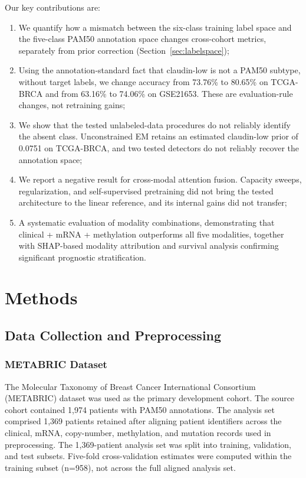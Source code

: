 \documentclass[11pt,a4paper]{article}
\begin{document}
Our key contributions are:
\begin{enumerate}[nosep]
  \item We quantify how a mismatch between the six-class training label space and the five-class PAM50 annotation space changes cross-cohort metrics, separately from prior correction (Section~\ref{sec:labelspace});
  \item Using the annotation-standard fact that claudin-low is not a PAM50 subtype, without target labels, we change accuracy from 73.76\% to 80.65\% on TCGA-BRCA and from 63.16\% to 74.06\% on GSE21653. These are evaluation-rule changes, not retraining gains;
  \item We show that the tested unlabeled-data procedures do not reliably identify the absent class. Unconstrained EM retains an estimated claudin-low prior of 0.0751 on TCGA-BRCA, and two tested detectors do not reliably recover the annotation space;
  \item We report a negative result for cross-modal attention fusion. Capacity sweeps, regularization, and self-supervised pretraining did not bring the tested architecture to the linear reference, and its internal gains did not transfer;
  \item A systematic evaluation of modality combinations, demonstrating that clinical + mRNA + methylation outperforms all five modalities, together with SHAP-based modality attribution and survival analysis confirming significant prognostic stratification.
\end{enumerate}

\section{Methods}
\label{sec:methods}

\subsection{Data Collection and Preprocessing}
\label{sec:data}

\subsubsection{METABRIC Dataset}
The Molecular Taxonomy of Breast Cancer International Consortium (METABRIC) dataset \citep{curtis2012genomic} was used as the primary development cohort. The source cohort contained 1,974 patients with PAM50 annotations. The analysis set comprised 1,369 patients retained after aligning patient identifiers across the clinical, mRNA, copy-number, methylation, and mutation records used in preprocessing. The 1,369-patient analysis set was split into training, validation, and test subsets. Five-fold cross-validation estimates were computed within the training subset (n=958), not across the full aligned analysis set.
\end{document}
